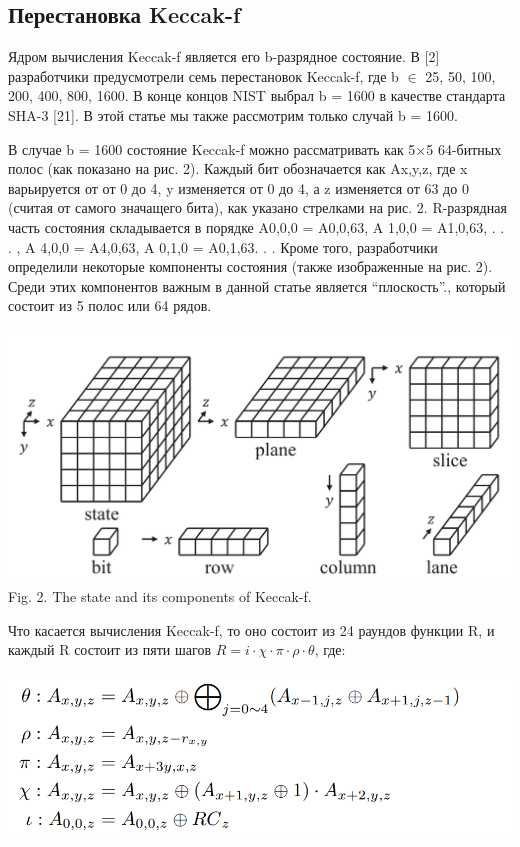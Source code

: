 \documentclass[utf8,14pt,a4paper,oneside,russian]{book}
\begin{document}
\subsection*{Перестановка Keccak-f}

Ядром вычисления Keccak-f является его b-разрядное состояние. В [2] разработчики предусмотрели
семь перестановок Keccak-f, где b $\in$ {25, 50, 100, 200, 400, 800, 1600}.
В конце концов NIST выбрал b = 1600 в качестве стандарта SHA-3 [21]. В этой статье мы также рассмотрим
только случай b = 1600.

В случае b = 1600 состояние Keccak-f можно рассматривать как 5×5 64-битных
полос (как показано на рис. 2). Каждый бит обозначается как Ax,y,z, где x варьируется от
от 0 до 4, y изменяется от 0 до 4, а z изменяется от 63 до 0 (считая от самого
значащего бита), как указано стрелками на рис. 2. R-разрядная часть состояния складывается в
порядке A0,0,0 = A0,0,63, A 1,0,0 = A1,0,63, . . . , A 4,0,0 = A4,0,63, A 0,1,0 = A0,1,63. . .
Кроме того, разработчики определили некоторые компоненты состояния (также изображенные
на рис. 2). Среди этих компонентов важным в данной статье является “плоскость”.,
который состоит из 5 полос или 64 рядов.

\begin{center}
    \includegraphics*[scale=0.3]{3}\\
    Fig. 2. The state and its components of Keccak-f.
\end{center}

Что касается вычисления Keccak-f, то оно состоит из 24 раундов функции R, и
каждый R состоит из пяти шагов $R = i \cdot \chi \cdot \pi \cdot \rho \cdot \theta$, где:

\begin{center}
    \includegraphics*[scale=0.5]{4}
\end{center}
\end{document}
